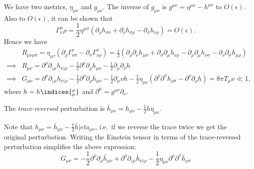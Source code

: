 \documentclass{jknotes}
\begin{document}
We have two metrics, \(\eta_{\mu\nu}\) and \(g_{\mu\nu}\). The inverse of \(g_{\mu\nu}\) is \(g^{\mu\nu} = \eta^{\mu\nu} - h^{\mu\nu}\) to \(O(\epsilon)\). Also to \(O(\epsilon)\), it can be shown that
\begin{equation}
    \Gamma^\mu_\nu\rho = \frac12\eta^{\mu\sigma} (\partial_\rho h_{\sigma\nu} + \partial_\nu h_{\sigma\rho} - \partial_\sigma h_{\nu\rho}) = O(\epsilon).
\end{equation}
Hence we have
\begin{align}
    & R_{\mu\nu\rho\sigma} = \eta_{\mu\tau}(\partial_\rho\Gamma^\tau_{\nu\sigma} - \partial_\sigma\Gamma^\tau_{\nu\rho}) 
    = \frac12(\partial_\rho\partial_\nu h_{\mu\sigma} + \partial_\sigma \partial_\mu h_{\nu\rho} - \partial_\rho\partial_\mu h_{\nu\sigma} - \partial_\nu\partial_\sigma h_{\mu\rho}) \\
    \implies & R_{\mu\nu} = \partial^\rho\partial_{(\mu}h_{\nu)\rho} - \frac12\partial^\rho\partial_\rho h_{\mu\nu} - \frac12\partial_\mu\partial_\nu h \\
    \implies & G_{\mu\nu} = \partial^\rho\partial_{(\mu}h_{\nu)\rho} - \frac12\partial^\rho\partial_\rho h_{\mu\nu} - \frac12\partial_\mu\nu h - \frac12 \eta_{\mu\nu} (\partial^\rho\partial^\sigma h_{\rho\sigma} - \partial^\rho\partial_\rho h) = 8\pi T_\mu\nu \ll 1,
\end{align}
where \(h = h\indices{^\mu_\mu}\) and \(\partial^\mu = g^{\mu\nu}\partial_\nu\).

\begin{defn}
    The \emph{trace-reversed} perturbation is \(\bar{h}_{\mu\nu} = h_{\mu\nu} - \frac12h\eta_{\mu\nu}\).
\end{defn}
Note that \(h_{\mu\nu} = \bar{h}_{\mu\nu} - \frac12\bar{h}|eta_{\mu\nu}\), i.e.\ if we reverse the trace twice we get the original perturbation. Writing the Einstein tensor in terms of the trace-reversed perturbation simplifies the above expression:
\begin{equation}
    G_{\mu\nu} = -\frac12\partial^\rho\partial_\rho \bar{h}_{\mu\nu} + \partial^\rho\partial_{(\mu}\bar{h}_{\nu)\rho} - \frac12\eta_{\mu\nu}\partial^\rho\partial^\sigma \bar{h}_{\rho\sigma}
\end{equation}
\end{document}
